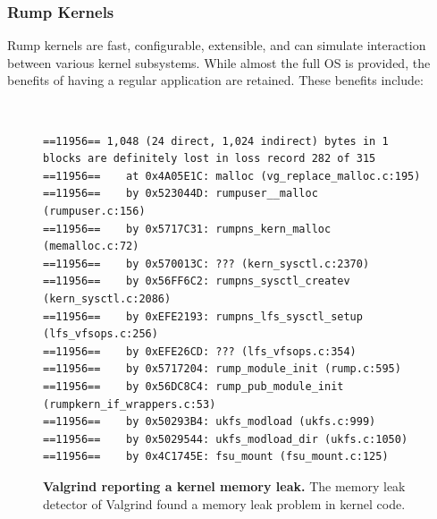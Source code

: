 \subsubsection*{Rump Kernels}

Rump kernels are fast, configurable, extensible, and can simulate
interaction between various kernel subsystems.  While almost the
full OS is provided, the benefits of having a regular application
are retained.  These benefits include:

\begin{figure}[t]
{\tt \scriptsize
\begin{verbatim}
==11956== 1,048 (24 direct, 1,024 indirect) bytes in 1 blocks are definitely lost in loss record 282 of 315
==11956==    at 0x4A05E1C: malloc (vg_replace_malloc.c:195)
==11956==    by 0x523044D: rumpuser__malloc (rumpuser.c:156)
==11956==    by 0x5717C31: rumpns_kern_malloc (memalloc.c:72)
==11956==    by 0x570013C: ??? (kern_sysctl.c:2370)
==11956==    by 0x56FF6C2: rumpns_sysctl_createv (kern_sysctl.c:2086)
==11956==    by 0xEFE2193: rumpns_lfs_sysctl_setup (lfs_vfsops.c:256)
==11956==    by 0xEFE26CD: ??? (lfs_vfsops.c:354)
==11956==    by 0x5717204: rump_module_init (rump.c:595)
==11956==    by 0x56DC8C4: rump_pub_module_init (rumpkern_if_wrappers.c:53)
==11956==    by 0x50293B4: ukfs_modload (ukfs.c:999)
==11956==    by 0x5029544: ukfs_modload_dir (ukfs.c:1050)
==11956==    by 0x4C1745E: fsu_mount (fsu_mount.c:125)
\end{verbatim}}
\caption[Valgrind reporting a kernel memory leak]{
\textbf{Valgrind reporting a kernel memory leak.}
The memory leak detector of Valgrind found a memory leak problem
in kernel code.
}
\label{fig:valgrind}
\end{figure}


